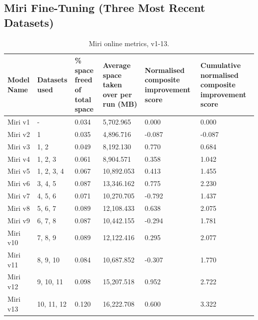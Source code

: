 \documentclass{article}
\begin{document}
\subsection{Miri Fine-Tuning (Three Most Recent Datasets)}
\begin{table}[H]
\centering
\setlength{\tabcolsep}{3pt}
\renewcommand{\arraystretch}{1.3}
\footnotesize
\begin{tabularx}{\textwidth}{|L|L|L|L|L|L|}
    \toprule
    \textbf{Model Name} & 
    \textbf{Datasets used} & 
    \textbf{\% space freed of total space} & 
    \textbf{Average space taken over per run (MB)} & 
    \textbf{Normalised composite improvement score} & 
    \textbf{Cumulative normalised composite improvement score} \\ 
    \hline
    Miri v1 & - & 0.034 & 5,702.965 & 0.000 & 0.000 \\ 
    \hline
    Miri v2 & 1 & 0.035 & 4,896.716 & -0.087 & -0.087 \\ 
    \hline
    Miri v3 & 1, 2 & 0.049 & 8,192.130 & 0.770 & 0.684 \\ 
    \hline
    Miri v4 & 1, 2, 3 & 0.061 & 8,904.571 & 0.358 & 1.042 \\ 
    \hline
    Miri v5 & 1, 2, 3, 4 & 0.067 & 10,892.053 & 0.413 & 1.455 \\ 
    \hline
    Miri v6 & 3, 4, 5 & 0.087 & 13,346.162 & 0.775 & 2.230 \\ 
    \hline
    Miri v7 & 4, 5, 6 & 0.071 & 10,270.705 & -0.792 & 1.437 \\
    \hline
    Miri v8 & 5, 6, 7 & 0.089 & 12,108.433 & 0.638 & 2.075 \\
    \hline
    Miri v9 & 6, 7, 8 & 0.087 & 10,442.155 & -0.294 & 1.781 \\
    \hline
    Miri v10 & 7, 8, 9 & 0.089 & 12,122.416 & 0.295 & 2.077 \\
    \hline
    Miri v11 & 8, 9, 10 & 0.084 & 10,687.852 & -0.307 & 1.770 \\
    \hline
    Miri v12 & 9, 10, 11 & 0.098 & 15,207.518 & 0.952 & 2.722 \\
    \hline
    Miri v13 & 10, 11, 12 & 0.120 & 16,222.708 & 0.600 & 3.322 \\
    \hline
\end{tabularx}
\caption{Miri online metrics, v1-13.}
\label{tab:miri_online_metrics}
\end{table}
\end{document}
